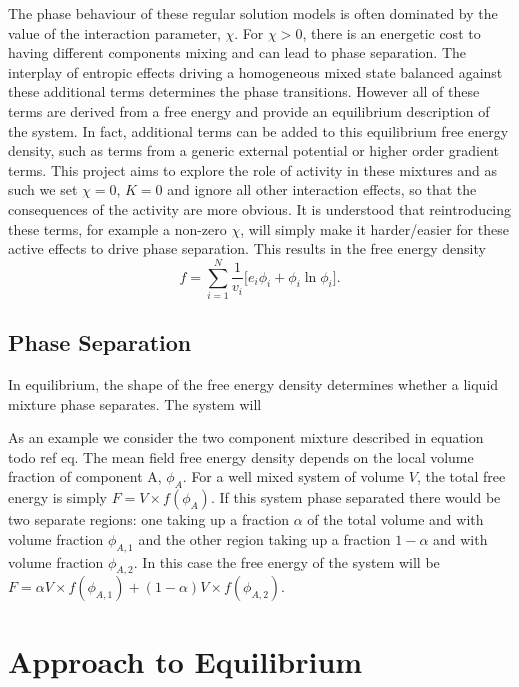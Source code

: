 The phase behaviour of these regular solution models is often dominated by the value of the interaction parameter, $\chi$. For $\chi > 0 $, there is an energetic cost to having different components mixing and can lead to phase separation. The interplay of entropic effects driving a homogeneous mixed state balanced against these additional terms determines the phase transitions. However all of these terms are derived from a free energy and provide an equilibrium description of the system. In fact, additional terms can be added to this equilibrium free energy density, such as terms from a generic external potential or higher order gradient terms. This project aims to explore the role of activity in these mixtures and as such we set $\chi = 0$, $K = 0$ and ignore all other interaction effects, so that the consequences of the activity are more obvious. It is understood that reintroducing these terms, for example a non-zero $\chi$, will simply make it harder/easier for these active effects to drive phase separation. This results in the free energy density
\begin{equation}
    f = \sum_{i=1}^{N}\frac{1}{v_i}\Bigg[e_i\phi_i + \phi_i\ln\phi_i\Bigg].
    \label{f}
\end{equation}

\subsection{Phase Separation}

In equilibrium, the shape of the free energy density determines whether a liquid mixture phase separates. The system will

As an example we consider the two component mixture described in equation todo ref eq. The mean field free energy density depends on the local volume fraction of component A, $\phi_A$. For a well mixed system of volume $V$, the total free energy is simply $F = V \times f(\phi_A)$. If this system phase separated there would be two separate regions: one taking up a fraction $\alpha$ of the total volume and with volume fraction $\phi_{A,1}$ and the other region taking up a fraction $1-\alpha$ and with volume fraction $\phi_{A,2}$. In this case the free energy of the system will be $F = \alpha V \times f(\phi_{A,1}) + (1-\alpha) V \times f(\phi_{A,2})$.

\section{Approach to Equilibrium}

